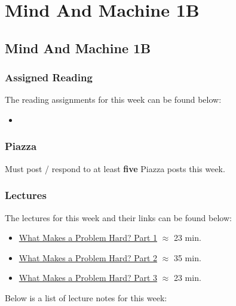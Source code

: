 \clearpage

\renewcommand{\ChapTitle}{Mind And Machine 1B}
\renewcommand{\SectionTitle}{Mind And Machine 1B}

\chapter{\ChapTitle}
\section{\SectionTitle}

\subsection{Assigned Reading}

The reading assignments for this week can be found below:

\begin{itemize}
    \item {}
\end{itemize}

\subsection{Piazza}

Must post / respond to at least \textbf{five} Piazza posts this week.

\subsection{Lectures}

The lectures for this week and their links can be found below:

\begin{itemize}
    \item \href{https://applied.cs.colorado.edu/mod/hvp/view.php?id=49327}{What Makes a Problem Hard? Part 1} $\approx$ 23 min.
    \item \href{https://www.youtube.com/watch?v=3kRKoFurkyU}{What Makes a Problem Hard? Part 2} $\approx$ 35 min.
    \item \href{https://www.youtube.com/watch?v=LxVXcaE9aPM}{What Makes a Problem Hard? Part 3} $\approx$ 23 min.
\end{itemize}

\noindent Below is a list of lecture notes for this week:

